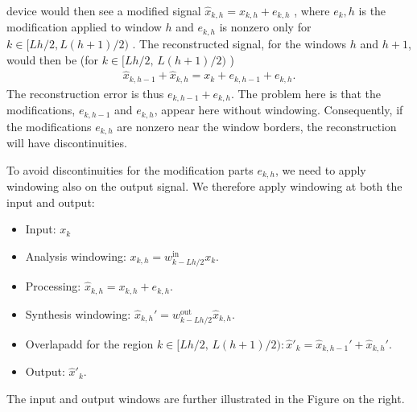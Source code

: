\documentclass[letterpaper,10pt,english]{jupyterBook}
\begin{document}
device would then see a modified signal \( \hat x_{k,h} = x_{k,h} +
e_{k,h} \) , where \(e_k,h\) is the modification applied to
window \(h\) and \(e_{k,h}\) is non\sphinxhyphen{}zero only for \( k \in [
Lh/2, L(h+1)/2) \) . The reconstructed signal, for the windows \(h\) and
\(h+1\), would then be (for \( k\in[Lh/2,\,L(h+1)/2) \) )
\begin{equation*}
\begin{split} \hat x_{k,h-1} + \hat x_{k,h} = x_k + e_{k,h-1} + e_{k,h}.
\end{split}
\end{equation*}
\sphinxAtStartPar
The reconstruction error is thus \(e_{k,h-1}+e_{k,h}\).
The problem here is that the modifications, \(e_{k,h-1}\) and
\(e_{k,h}\), appear here without windowing. Consequently, if the
modifications \(e_{k,h}\) are non\sphinxhyphen{}zero near the window borders,
the reconstruction will have discontinuities.

\sphinxAtStartPar
To avoid discontinuities for the modification parts \(e_{k,h}\),
we need to apply windowing also on the output signal. We therefore apply
windowing at both the input and output:
\begin{itemize}
\item {} 
\sphinxAtStartPar
Input: \(x_k\)

\item {} 
\sphinxAtStartPar
Analysis windowing:  \( x_{k,h} = w^{\text{in}}_{k-Lh/2} x_k. \)

\item {} 
\sphinxAtStartPar
Processing: \( \hat x_{k,h} = x_{k,h}+e_{k,h}. \)

\item {} 
\sphinxAtStartPar
Synthesis windowing: \( \hat x_{k,h}' = w^{\text{out}}_{k-Lh/2} \hat x_{k,h}. \)

\item {} 
\sphinxAtStartPar
Overlap\sphinxhyphen{}add for the region \( k\in[Lh/2,\,L(h+1)/2):  \hat x'_k = \hat x_{k,h-1}'+\hat x_{k,h}'. \)

\item {} 
\sphinxAtStartPar
Output: \( \hat x'_k. \)

\end{itemize}

\sphinxAtStartPar
The input and output windows are further illustrated in the Figure on
the right.
\end{document}
